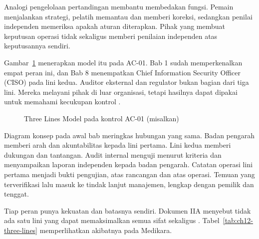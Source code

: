 Analogi pengelolaan pertandingan membantu membedakan fungsi. Pemain menjalankan strategi, pelatih
memantau dan memberi koreksi, sedangkan penilai independen memeriksa apakah aturan diterapkan.
Pihak yang membuat keputusan operasi tidak sekaligus memberi penilaian independen atas
keputusannya sendiri.

Gambar~\ref{fig:ch12-tiga-lini} menerapkan model itu pada AC-01. Bab 1 sudah memperkenalkan empat
peran ini, dan Bab 8 menempatkan Chief Information Security Officer (CISO) pada lini kedua.
Auditor eksternal dan regulator bukan bagian dari tiga lini. Mereka melayani pihak di luar
organisasi, tetapi hasilnya dapat dipakai untuk memahami kecukupan kontrol \cite{iia-tlm2026}.

\begin{figure}[!htb]
  \centering
  
  \caption{Three Lines Model pada kontrol AC-01 (misalkan)}
  \label{fig:ch12-tiga-lini}
\end{figure}

Diagram konsep pada awal bab meringkas hubungan yang sama. Badan pengarah memberi arah dan
akuntabilitas kepada lini pertama. Lini kedua memberi dukungan dan tantangan. Audit internal
menguji menurut kriteria dan menyampaikan laporan independen kepada badan pengarah. Catatan
operasi lini pertama menjadi bukti pengujian, atas rancangan dan atas operasi. Temuan yang
terverifikasi lalu masuk ke tindak lanjut manajemen, lengkap dengan pemilik dan tenggat.

Tiap peran punya kekuatan dan batasnya sendiri. Dokumen IIA menyebut tidak ada satu lini yang
dapat memaksimalkan semua sifat sekaligus \cite{iia-tlm2026}. Tabel~\ref{tab:ch12-three-lines}
memperlihatkan akibatnya pada Medikara.

